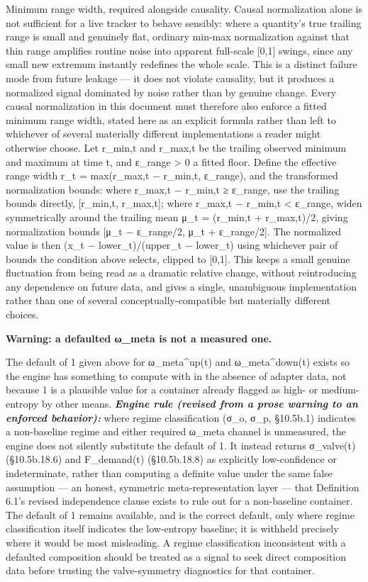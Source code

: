 \documentclass[
]{article}
\begin{document}
Minimum range width, required alongside causality. Causal normalization
alone is not sufficient for a live tracker to behave sensibly: where a
quantity's true trailing range is small and genuinely flat, ordinary
min-max normalization against that thin range amplifies routine noise
into apparent full-scale {[}0,1{]} swings, since any small new extremum
instantly redefines the whole scale. This is a distinct failure mode
from future leakage --- it does not violate causality, but it produces a
normalized signal dominated by noise rather than by genuine change.
Every causal normalization in this document must therefore also enforce
a fitted minimum range width, stated here as an explicit formula rather
than left to whichever of several materially different implementations a
reader might otherwise choose. Let r\_min,t and r\_max,t be the trailing
observed minimum and maximum at time t, and ε\_range \textgreater{} 0 a
fitted floor. Define the effective range width r\_t = max(r\_max,t −
r\_min,t, ε\_range), and the transformed normalization bounds: where
r\_max,t − r\_min,t ≥ ε\_range, use the trailing bounds directly,
{[}r\_min,t, r\_max,t{]}; where r\_max,t − r\_min,t \textless{}
ε\_range, widen symmetrically around the trailing mean μ\_t = (r\_min,t
+ r\_max,t)/2, giving normalization bounds {[}μ\_t − ε\_range/2, μ\_t +
ε\_range/2{]}. The normalized value is then (x\_t − lower\_t)/(upper\_t
− lower\_t) using whichever pair of bounds the condition above selects,
clipped to {[}0,1{]}. This keeps a small genuine fluctuation from being
read as a dramatic relative change, without reintroducing any dependence
on future data, and gives a single, unambiguous implementation rather
than one of several conceptually-compatible but materially different
choices.

\textbf{Warning: a defaulted ω\_meta is not a measured one.}

The default of 1 given above for ω\_meta\^{}up(t) and ω\_meta\^{}down(t)
exists so the engine has something to compute with in the absence of
adapter data, not because 1 is a plausible value for a container already
flagged as high- or medium-entropy by other means. \emph{\textbf{Engine
rule (revised from a prose warning to an enforced behavior):}} where
regime classification (σ\_o, σ\_p, §10.5b.1) indicates a non-baseline
regime and either required ω\_meta channel is unmeasured, the engine
does not silently substitute the default of 1. It instead returns
σ\_valve(t) (§10.5b.18.6) and F\_demand(t) (§10.5b.18.8) as explicitly
low-confidence or indeterminate, rather than computing a definite value
under the same false assumption --- an honest, symmetric
meta-representation layer --- that Definition 6.1's revised independence
clause exists to rule out for a non-baseline container. The default of 1
remains available, and is the correct default, only where regime
classification itself indicates the low-entropy baseline; it is withheld
precisely where it would be most misleading. A regime classification
inconsistent with a defaulted composition should be treated as a signal
to seek direct composition data before trusting the valve-symmetry
diagnostics for that container.
\end{document}
